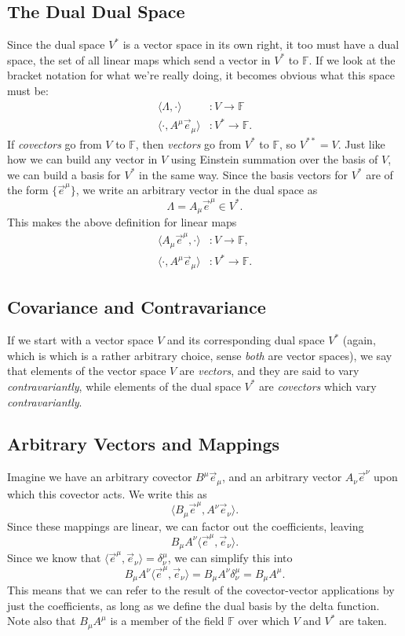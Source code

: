 \subsection{The Dual Dual Space}
Since the dual space $V^*$ is a vector space in its own right, it too must have a dual space, the set of all linear maps which send a vector in $V^*$ to $\mathbb{F}$.
If we look at the bracket notation for what we're really doing, it becomes obvious what this space must be:
\begin{align*}
    \langle \Lambda, \cdot \rangle &: V \to \mathbb{F} \\
    \langle \cdot, A^\mu \vec{e}_\mu \rangle &: V^* \to \mathbb{F}.
\end{align*}
If \emph{covectors} go from $V$ to $\mathbb{F}$, then \emph{vectors} go from $V^*$ to $\mathbb{F}$, so $V^{**} = V$.
Just like how we can build any vector in $V$ using Einstein summation over the basis of $V$, we can build a basis for $V^*$ in the same way. Since the basis vectors for $V^*$ are of the form $\{\vec{e}^\mu\}$, we write an arbitrary vector in the dual space as
\[ \Lambda = A_\mu \vec{e}^\mu \in V^*. \]
This makes the above definition for linear maps
\begin{align*}
    \langle A_\mu \vec{e}^\mu, \cdot \rangle &: V \to \mathbb{F}, \\
    \langle \cdot, A^\mu \vec{e}_\mu \rangle &: V^* \to \mathbb{F}.
\end{align*}

\subsection{Covariance and Contravariance}
If we start with a vector space $V$ and its corresponding dual space $V^*$ (again, which is which is a rather arbitrary choice, sense \emph{both} are vector spaces), we say that elements of the vector space $V$ are \emph{vectors}, and they are said to vary \emph{contravariantly}, while elements of the dual space $V^*$ are \emph{covectors} which vary \emph{contravariantly}.

\subsection{Arbitrary Vectors and Mappings}
Imagine we have an arbitrary covector $B^\mu \vec{e}_\mu$, and an arbitrary vector $A_\nu \vec{e}^\nu$ upon which this covector acts. We write this as 
\[ \langle B_\mu \vec{e}^\mu, A^\nu \vec{e}_\nu \rangle. \]
Since these mappings are linear, we can factor out the coefficients, leaving
\[ B_\mu A^\nu \langle \vec{e}^\mu, \vec{e}_\nu \rangle. \]
Since we know that $\langle \vec{e}^\mu, \vec{e}_\nu \rangle = \delta^\mu_\nu$, we can simplify this into
\[ B_\mu A^\nu \langle \vec{e}^\mu, \vec{e}_\nu \rangle = B_\mu A^\nu \delta^\mu_\nu = B_\mu A^\mu. \]
This means that we can refer to the result of the covector-vector applications by just the coefficients, as long as we define the dual basis by the delta function.
Note also that $B_\mu A^\mu$ is a member of the field $\mathbb{F}$ over which $V$ and $V^*$ are taken.